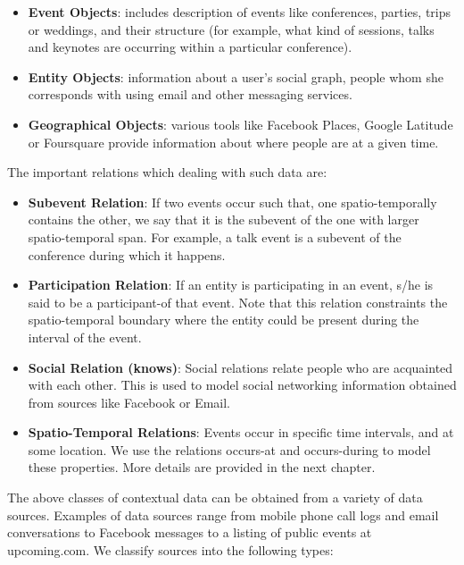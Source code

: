 \begin{itemize}
\item \textbf{Event Objects}: includes description of events like conferences, parties, trips or weddings, and their structure (for example, what kind of sessions, talks and keynotes are occurring within a particular conference).
\item \textbf{Entity Objects}: information about a user's social graph, people whom she corresponds with using email and other messaging services.
\item \textbf{Geographical Objects}: various tools like Facebook Places, Google Latitude or Foursquare provide information about where people are at a given time.
\end{itemize}

The important relations which dealing with such data are:

\begin{itemize}
\item \textbf{Subevent Relation}: If two events occur such that, one spatio-temporally contains the other, we say that it is the subevent of the one with larger spatio-temporal span. For example, a talk event is a subevent of the conference during which it happens.
\item \textbf{Participation Relation}: If an entity is participating in an event, s/he is said to be a participant-of that event. Note that this relation constraints the spatio-temporal boundary where the entity could be present during the interval of the event.
\item \textbf{Social Relation (knows)}: Social relations relate people who are acquainted with each other. This is used to model social networking information obtained from sources like Facebook or Email.
\item \textbf{Spatio-Temporal Relations}: Events occur in specific time intervals, and at some location. We use the relations occurs-at and occurs-during to model these properties. More details are provided in the next chapter.
\end{itemize}

The above classes of contextual data can be obtained from a variety of data sources. Examples of data sources range from mobile phone call logs and email conversations to Facebook messages to a listing of public events at upcoming.com. We classify sources into the following types:

